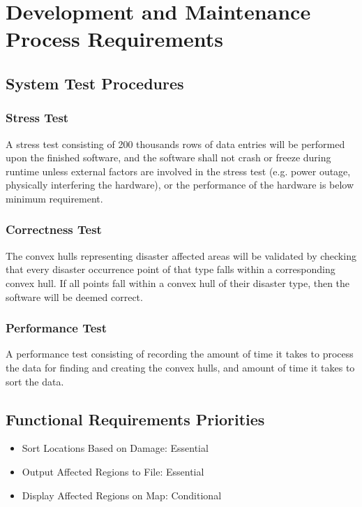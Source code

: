 \documentclass{article}
\begin{document}
    \section{Development and Maintenance Process Requirements}
    \subsection{System Test Procedures}
    \subsubsection{Stress Test}
    A stress test consisting of 200 thousands rows of data entries will be 
    performed upon the finished software, and the software shall not crash 
    or freeze during runtime unless external factors are involved in the 
    stress test (e.g. power outage, physically interfering the hardware),
    or the performance of the hardware is below minimum requirement.

    \subsubsection{Correctness Test}
    The convex hulls representing disaster affected areas will be validated 
    by checking that every disaster occurrence point of that type falls within a 
    corresponding convex hull. If all points fall within a convex hull of their 
    disaster type, then the software will be deemed correct.

    \subsubsection {Performance Test}
    A performance test consisting of recording the amount of time it takes to 
    process the data for finding and creating the convex hulls, and amount of 
    time it takes to sort the data.
        \subsection{Functional Requirements Priorities}
            \begin{itemize}
                \item Sort Locations Based on Damage: Essential
                \item Output Affected Regions to File: Essential
                \item Display Affected Regions on Map: Conditional
            \end{itemize}
\end{document}
